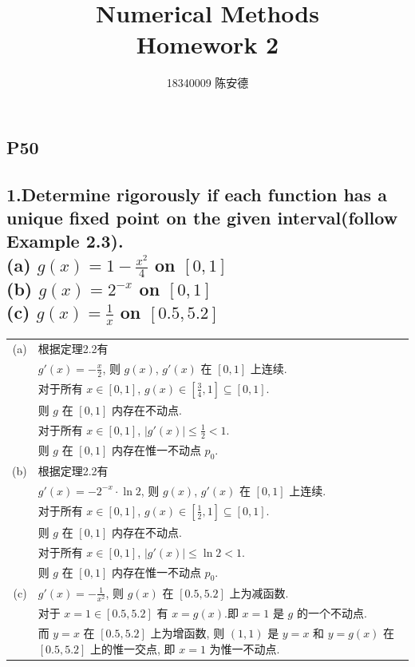 \documentclass{ctexart}
\title{Numerical Methods \\ Homework 2}
\author{18340009 陈安德}
\date{}
\begin{document}
    \maketitle
\begin{flushleft}
    \section*{P50}
    \subsection*{1.Determine rigorously if each function has a unique fixed point on the given interval(follow Example 2.3). \\ 
    (a) $g(x)=1-\frac{x^2}{4}$ on $[0,1]$ \\
    (b) $g(x)=2^{-x}$ on $[0,1]$ \\
    (c) $g(x)=\frac{1}{x}$ on $[0.5,5.2]$ }
    \begin{tabular}{rl}
    (a)& 根据定理2.2有 \\
       & $g'(x)=-\frac{x}{2}$, 则 $g(x)$, $g'(x)$ 在 $[0,1]$ 上连续.\\
       & 对于所有 $x\in[0,1]$, $g(x)\in[\frac{3}{4},1]\subseteq[0,1]$. \\
       & 则 $g$ 在 $[0,1]$ 内存在不动点. \\
       & 对于所有 $x\in[0,1]$, $|g'(x)|\leq\frac{1}{2}<1$. \\
       & 则 $g$ 在 $[0,1]$ 内存在惟一不动点 $p_0$. \\
    (b)& 根据定理2.2有 \\
       & $g'(x)=-2^{-x}\cdot\ln2$, 则 $g(x)$, $g'(x)$ 在 $[0,1]$ 上连续.\\
       & 对于所有 $x\in[0,1]$, $g(x)\in[\frac{1}{2},1]\subseteq[0,1]$. \\
       & 则 $g$ 在 $[0,1]$ 内存在不动点. \\
       & 对于所有 $x\in[0,1]$, $|g'(x)|\leq\ln2<1$. \\
       & 则 $g$ 在 $[0,1]$ 内存在惟一不动点 $p_0$. \\
    (c)& $g'(x)=-\frac{1}{x^2}$, 则 $g(x)$ 在 $[0.5,5.2]$ 上为减函数.\\
       & 对于 $x=1\in[0.5,5.2]$ 有 $x=g(x)$.即 $x=1$ 是 $g$ 的一个不动点.\\
       & 而 $y=x$ 在 $[0.5,5.2]$ 上为增函数, 则 $(1,1)$ 是 $y=x$ 和 $y=g(x)$ 在 $[0.5,5.2]$ 上的惟一交点, 即 $x=1$ 为惟一不动点.
    \end{tabular}


\end{flushleft}
\end{document}
